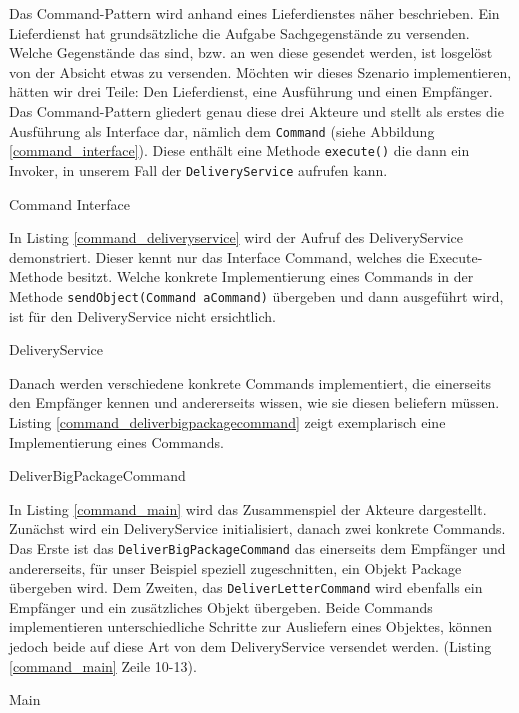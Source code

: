 Das Command-Pattern wird anhand eines Lieferdienstes näher beschrieben. Ein Lieferdienst hat grundsätzliche die Aufgabe Sachgegenstände zu versenden. Welche Gegenstände das sind, bzw. an wen diese gesendet werden, ist losgelöst von der Absicht etwas zu versenden. Möchten wir dieses Szenario implementieren, hätten wir drei Teile: Den Lieferdienst, eine Ausführung und einen Empfänger. Das Command-Pattern gliedert genau diese drei Akteure und stellt als erstes die Ausführung als Interface dar, nämlich dem \texttt{Command} (siehe Abbildung \ref{command_interface}). Diese enthält eine Methode \texttt{execute()} die dann ein Invoker, in unserem Fall der \texttt{DeliveryService} aufrufen kann. 


\begin{listing}[h!]
   \centering
   \caption{Command Interface}
    \label{command_interface}
\end{listing}  

In Listing \ref{command_deliveryservice} wird der Aufruf des DeliveryService demonstriert. Dieser kennt nur das Interface Command, welches die Execute-Methode besitzt. Welche konkrete Implementierung eines Commands in der Methode \texttt{sendObject(Command aCommand)} übergeben und dann ausgeführt wird, ist für den DeliveryService nicht ersichtlich. 

\begin{listing}[h!]
   \centering
   \caption{DeliveryService}
    \label{command_deliveryservice}
\end{listing} 

Danach werden verschiedene konkrete Commands implementiert, die einerseits den Empfänger kennen und andererseits wissen, wie sie diesen beliefern müssen. Listing \ref{command_deliverbigpackagecommand} zeigt exemplarisch eine Implementierung eines Commands. 


\begin{listing}[h!]
   \centering
   \caption{DeliverBigPackageCommand}
    \label{command_deliverbigpackagecommand}
\end{listing}  

In Listing \ref{command_main} wird das Zusammenspiel der Akteure dargestellt. Zunächst wird ein DeliveryService initialisiert, danach zwei konkrete Commands. Das Erste ist das \texttt{DeliverBigPackageCommand} das einerseits dem Empfänger und andererseits, für unser Beispiel speziell zugeschnitten, ein Objekt Package übergeben wird. Dem Zweiten, das \texttt{DeliverLetterCommand} wird ebenfalls ein Empfänger und ein zusätzliches Objekt übergeben. Beide Commands implementieren unterschiedliche Schritte zur Ausliefern eines Objektes, können jedoch beide auf diese Art von dem DeliveryService versendet werden. (Listing \ref{command_main} Zeile 10-13).

\begin{listing}[h!]
   \centering
   \caption{Main}
    \label{command_main}
\end{listing}  
